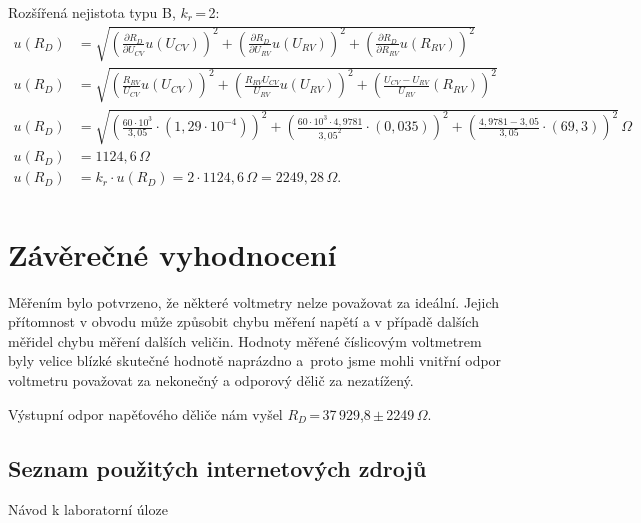 \documentclass[a4paper,12pt]{article}   %
\newcommand{\rd}{$R_{D}$}
\newcommand{\eucv}{U_{CV}}
\newcommand{\eurv}{U_{RV}}
\newcommand{\errv}{R_{RV}}
\newcommand{\erd}{R_{D}}
\begin{document}
Rozšířená nejistota typu B, $k_r$\,=\,2:
\begin{equation*}
    \begin{split}
        u(\erd)&=\sqrt{\left( \frac{\partial \erd}{\partial\eucv}u(\eucv) \right)^2+\left( \frac{\partial \erd}{\partial\eurv}u(\eurv) \right)^2+\left( \frac{\partial \erd}{\partial\errv}u(\errv) \right)^2}\\
        u(\erd)&=\sqrt{\left( \frac{\errv}{\eucv}u(\eucv) \right)^2+\left( \frac{\errv\eucv}{\eurv}u(\eurv) \right)^2+\left( \frac{\eucv-\eurv}{\eurv}(\errv) \right)^2}\\
        u(\erd)&=\sqrt{\left( \frac{60\cdot10^{3}}{3,05}\cdot(1,29\cdot 10^{-4}) \right)^2+\left( \frac{60\cdot 10^3\cdot 4,9781}{3,05^2}\cdot(0,035) \right)^2+\left( \frac{4,9781-3,05}{3,05}\cdot(69,3) \right)^2}\,\Omega\\
        u(\erd)&=1124,6\,\Omega\\
        u(\erd)&=k_r\cdot u(\erd)=2\cdot 1124,6\,\Omega = 2249,28\,\Omega.\\
    \end{split}
\end{equation*}


\section{Závěrečné vyhodnocení}
Měřením bylo potvrzeno, že některé voltmetry nelze považovat za ideální. Jejich přítomnost v obvodu může způsobit chybu měření napětí a v případě dalších měřidel chybu měření dalších veličin. Hodnoty měřené číslicovým voltmetrem byly velice blízké skutečné hodnotě naprázdno a~proto jsme mohli vnitřní odpor voltmetru považovat za nekonečný a odporový dělič za nezatížený.

Výstupní odpor napěťového děliče nám vyšel \rd \,=\,37\,929,8\,$\pm$\,2249\,$\Omega$.





\clearpage
\renewcommand{\refname}{Seznam použité literatury a~zdrojů informací} 

\begin{thebibliography}{99}

\subsection*{Seznam použitých internetových zdrojů}
     Návod k laboratorní úloze
    
\end{thebibliography}
\end{document}
